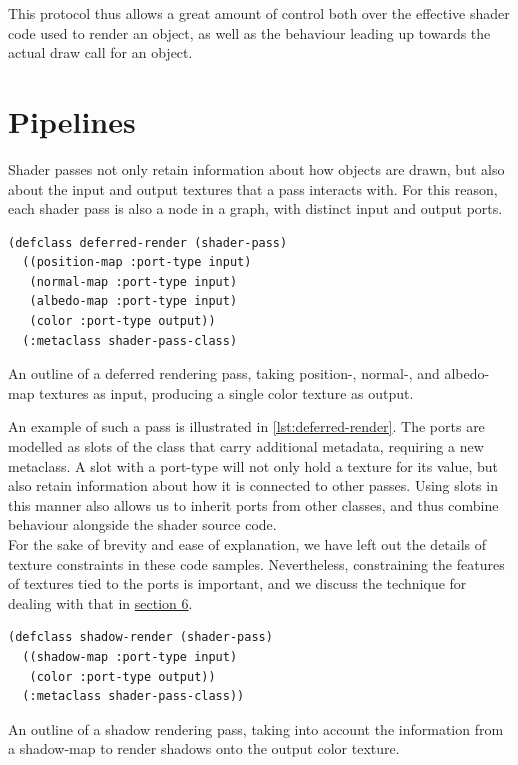 \documentclass[format=sigconf]{acmart}
\begin{document}
This protocol thus allows a great amount of control both over the effective shader code used to render an object, as well as the behaviour leading up towards the actual draw call for an object.

\section{Pipelines}\label{pipelines}
Shader passes not only retain information about how objects are drawn, but also about the input and output textures that a pass interacts with. For this reason, each shader pass is also a node in a graph, with distinct input and output ports.

\begin{listing}[h]
\begin{verbatim}
(defclass deferred-render (shader-pass)
  ((position-map :port-type input)
   (normal-map :port-type input)
   (albedo-map :port-type input)
   (color :port-type output))
  (:metaclass shader-pass-class)
\end{verbatim}
\caption{An outline of a deferred rendering pass, taking position-, normal-, and albedo-map textures as input, producing a single color texture as output.}
\label{lst:deferred-render}
\end{listing}

An example of such a pass is illustrated in \autoref{lst:deferred-render}. The ports are modelled as slots of the class that carry additional metadata, requiring a new metaclass. A slot with a port-type will not only hold a texture for its value, but also retain information about how it is connected to other passes. Using slots in this manner also allows us to inherit ports from other classes, and thus combine behaviour alongside the shader source code. \\

For the sake of brevity and ease of explanation, we have left out the details of texture constraints in these code samples. Nevertheless, constraining the features of textures tied to the ports is important, and we discuss the technique for dealing with that in \hyperref[allocation]{section 6}.

\begin{listing}[h]
\begin{verbatim}
(defclass shadow-render (shader-pass)
  ((shadow-map :port-type input)
   (color :port-type output))
  (:metaclass shader-pass-class))
\end{verbatim}
\caption{An outline of a shadow rendering pass, taking into account the information from a shadow-map to render shadows onto the output color texture.}
\label{lst:shadow-render}
\end{listing}
\end{document}
